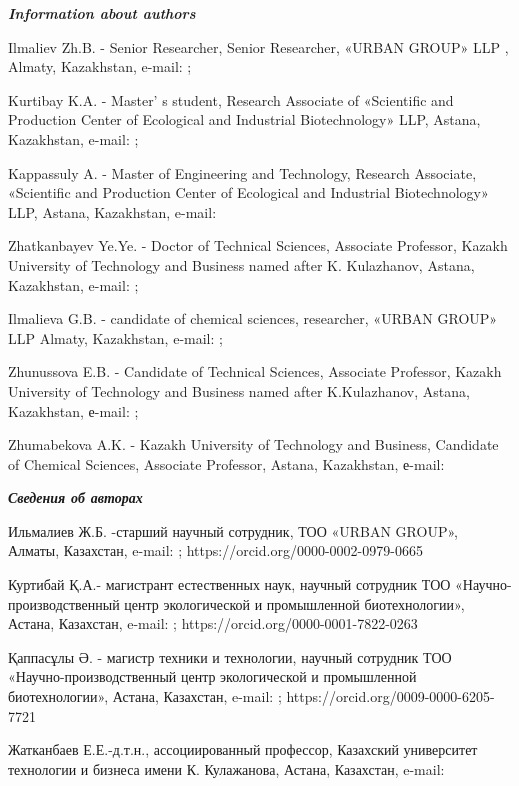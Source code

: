 \emph{{\bfseries Information about authors}}

Ilmaliev Zh.B. - Senior Researcher, Senior Researcher, «URBAN GROUP» LLP
, Almaty, Kazakhstan, e-mail:
\href{mailto:jans2009@mail.ru}{};

Kurtibay K.A. - Master' s student, Research Associate of
«Scientific and Production Center of Ecological and Industrial
Biotechnology» LLP, Astana, Kazakhstan, e-mail:
\href{mailto:kurtibayqb@gmail.com}{};

Kappassuly A. - Master of Engineering and Technology, Research
Associate, «Scientific and Production Center of Ecological and
Industrial Biotechnology» LLP, Astana, Kazakhstan, e-mail:
\href{mailto:kappasuly@mail.ru}{}

Zhatkanbayev Ye.Ye. - Doctor of Technical Sciences, Associate Professor,
Kazakh University of Technology and Business named after K. Kulazhanov,
Astana, Kazakhstan, e-mail:
\href{mailto:erlan.ntp@mail.ru}{};

Ilmalieva G.B. - candidate of chemical sciences, researcher, «URBAN
GROUP» LLP Almaty, Kazakhstan, e-mail:
\href{mailto:g.ilmaliyeva@qazindustry.gov.kz}{};

Zhunussova E.B. - Candidate of Technical Sciences, Associate Professor,
Kazakh University of Technology and Business named after K.Kulazhanov,
Astana, Kazakhstan, е-mail:
\href{mailto:tahmina.66@mail.ru}{};

Zhumabekova A.K. - Kazakh University of Technology and Business,
Candidate of Chemical Sciences, Associate Professor, Astana, Kazakhstan,
е-mail:
\href{mailto:zhumabekova_ak@mail.ru}{}

\emph{{\bfseries Сведения об авторах}}

Ильмалиев Ж.Б. -старший научный сотрудник, ТОО «URBAN GROUP», Алматы,
Казахстан, e-mail:
\href{mailto:jans2009@mail.ru}{};
https://orcid.org/0000-0002-0979-0665

Куртибай Қ.А.- магистрант естественных наук, научный сотрудник ТОО
«Научно-производственный центр экологической и промышленной
биотехнологии», Астана, Казахстан, e-mail:
\href{mailto:kurtibayqb@gmail.com}{};
https://orcid.org/0000-0001-7822-0263

Қаппасұлы Ә. - магистр техники и технологии, научный сотрудник ТОО
«Научно-производственный центр экологической и промышленной
биотехнологии», Астана, Казахстан, e-mail:
\href{mailto:kappasuly@mail.ru}{};
https://orcid.org/0009-0000-6205-7721

Жатканбаев Е.Е.-д.т.н., ассоциированный профессор, Казахский университет
технологии и бизнеса имени К. Кулажанова, Астана, Казахстан, e-mail:

